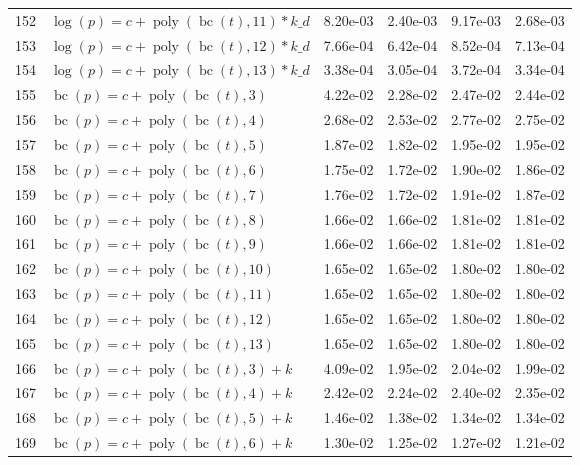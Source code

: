 \documentclass[12pt,a4paper]{article}
\DeclareMathOperator{\bc}{bc}
\DeclareMathOperator{\poly}{poly}
\begin{document}
\begin{longtable}[t]{ll>{\raggedleft\arraybackslash}p{2cm}>{\raggedleft\arraybackslash}p{2cm}>{\raggedleft\arraybackslash}p{2cm}>{\raggedleft\arraybackslash}p{2cm}}
152 & $\log(p) = c + \poly\left( \bc(t), 11 \right) * k\_d$ & 8.20e-03 & 2.40e-03 & 9.17e-03 & 2.68e-03\\
\rowcolor{gray!6}  153 & $\log(p) = c + \poly\left( \bc(t), 12 \right) * k\_d$ & 7.66e-04 & 6.42e-04 & 8.52e-04 & 7.13e-04\\
154 & $\log(p) = c + \poly\left( \bc(t), 13 \right) * k\_d$ & 3.38e-04 & 3.05e-04 & 3.72e-04 & 3.34e-04\\
\rowcolor{gray!6}  155 & $\bc(p) = c + \poly\left( \bc(t), 3 \right)$ & 4.22e-02 & 2.28e-02 & 2.47e-02 & 2.44e-02\\
156 & $\bc(p) = c + \poly\left( \bc(t), 4 \right)$ & 2.68e-02 & 2.53e-02 & 2.77e-02 & 2.75e-02\\
\rowcolor{gray!6}  157 & $\bc(p) = c + \poly\left( \bc(t), 5 \right)$ & 1.87e-02 & 1.82e-02 & 1.95e-02 & 1.95e-02\\
158 & $\bc(p) = c + \poly\left( \bc(t), 6 \right)$ & 1.75e-02 & 1.72e-02 & 1.90e-02 & 1.86e-02\\
\rowcolor{gray!6}  159 & $\bc(p) = c + \poly\left( \bc(t), 7 \right)$ & 1.76e-02 & 1.72e-02 & 1.91e-02 & 1.87e-02\\
160 & $\bc(p) = c + \poly\left( \bc(t), 8 \right)$ & 1.66e-02 & 1.66e-02 & 1.81e-02 & 1.81e-02\\
\rowcolor{gray!6}  161 & $\bc(p) = c + \poly\left( \bc(t), 9 \right)$ & 1.66e-02 & 1.66e-02 & 1.81e-02 & 1.81e-02\\
162 & $\bc(p) = c + \poly\left( \bc(t), 10 \right)$ & 1.65e-02 & 1.65e-02 & 1.80e-02 & 1.80e-02\\
\rowcolor{gray!6}  163 & $\bc(p) = c + \poly\left( \bc(t), 11 \right)$ & 1.65e-02 & 1.65e-02 & 1.80e-02 & 1.80e-02\\
164 & $\bc(p) = c + \poly\left( \bc(t), 12 \right)$ & 1.65e-02 & 1.65e-02 & 1.80e-02 & 1.80e-02\\
\rowcolor{gray!6}  165 & $\bc(p) = c + \poly\left( \bc(t), 13 \right)$ & 1.65e-02 & 1.65e-02 & 1.80e-02 & 1.80e-02\\
166 & $\bc(p) = c + \poly\left( \bc(t), 3 \right) + k$ & 4.09e-02 & 1.95e-02 & 2.04e-02 & 1.99e-02\\
\rowcolor{gray!6}  167 & $\bc(p) = c + \poly\left( \bc(t), 4 \right) + k$ & 2.42e-02 & 2.24e-02 & 2.40e-02 & 2.35e-02\\
168 & $\bc(p) = c + \poly\left( \bc(t), 5 \right) + k$ & 1.46e-02 & 1.38e-02 & 1.34e-02 & 1.34e-02\\
\rowcolor{gray!6}  169 & $\bc(p) = c + \poly\left( \bc(t), 6 \right) + k$ & 1.30e-02 & 1.25e-02 & 1.27e-02 & 1.21e-02\\

\end{longtable}
\end{document}
